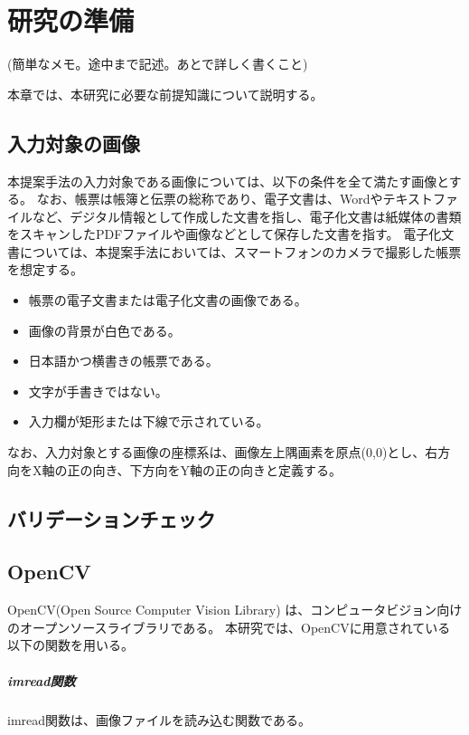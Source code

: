 \chapter{研究の準備}\label{cha:Preparation}
(簡単なメモ。途中まで記述。あとで詳しく書くこと)

本章では、本研究に必要な前提知識について説明する。


\section{入力対象の画像}\label{sec:input_images}
本提案手法の入力対象である画像については、以下の条件を全て満たす画像とする。
なお、帳票は帳簿と伝票の総称であり\cite{帳票}、電子文書は、Wordやテキストファイルなど、デジタル情報として作成した文書を指し、電子化文書は紙媒体の書類をスキャンしたPDFファイルや画像などとして保存した文書を指す\cite{電子文書と電子化文書}。
電子化文書については、本提案手法においては、スマートフォンのカメラで撮影した帳票を想定する。

\begin{itemize}
	\item 帳票の電子文書または電子化文書の画像である。
	\item 画像の背景が白色である。
	\item 日本語かつ横書きの帳票である。
	\item 文字が手書きではない。
	\item 入力欄が矩形または下線で示されている。
\end{itemize}

なお、入力対象とする画像の座標系は、画像左上隅画素を原点(0,0)とし、右方向をX軸の正の向き、下方向をY軸の正の向きと定義する。

\section{バリデーションチェック}\label{sec:validation_check}


\section{OpenCV}\label{sec:OpenCV}
OpenCV(Open Source Computer Vision Library) は、コンピュータビジョン向けのオープンソースライブラリである\cite{OpenCV}。
本研究では、OpenCVに用意されている以下の関数を用いる。

\paragraph{imread関数}
imread関数は、画像ファイルを読み込む関数である。

